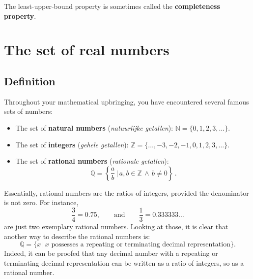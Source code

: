 	The least-upper-bound property is sometimes called the \textbf{completeness property}.
	

\fi
\fi


\section{The set of real numbers}
\label{sec_real}
\subsection{Definition}

Throughout your mathematical upbringing, you have encountered several famous sets of numbers:  
\begin{itemize}
	\item The set of  \textbf{natural numbers} (\textit{natuurlijke getallen}):  $\mathbb N= \{ 0, 1, 2, 3,  \ldots\}$.
	\item The set of \textbf{integers} (\textit{gehele getallen}): $\mathbb Z=\{ \ldots, -3, -2, -1, 0, 1, 2, 3, \ldots \}$.
	\item The set of \textbf{rational numbers} (\textit{rationale getallen}): $$\mathbb Q=\left\{\dfrac{a}{b} \, \bigg| \, a,b  \in \mathbb Z \, \wedge \, b \neq 0 \right\}\,.$$
\end{itemize}
Essentially, rational numbers are the ratios of integers, provided the denominator is not zero. For instance, 
$$
\dfrac{3}{4}=0.75, \qquad \mbox{and}\qquad \dfrac{1}{3}=0.333333\ldots
$$
are just two exemplary rational numbers.  Looking at those, it is clear that another way to describe the rational numbers is:
\[\mathbb Q=\{x\,|\,\mbox{$x$ possesses a repeating or terminating decimal representation}\}.\]
Indeed, it can be proofed that any decimal number with a repeating or terminating decimal representation can be written as a ratio of integers, so as a rational number. 


